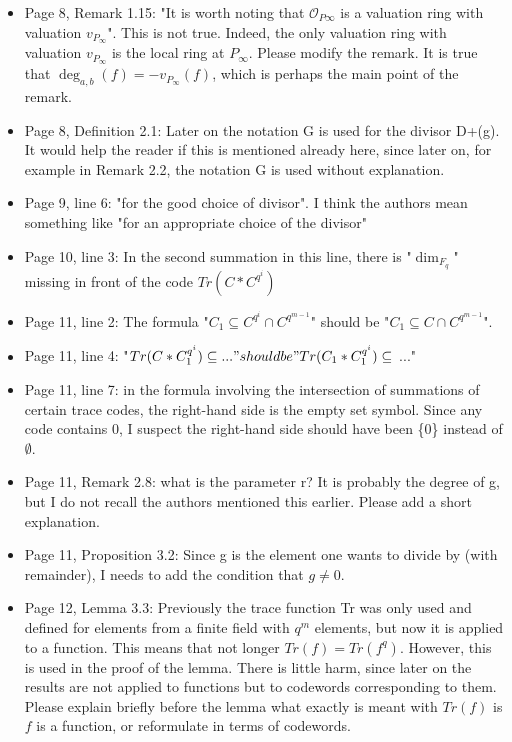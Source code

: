\documentclass[12pt,a4paper]{amsart}
\begin{document}
\begin{itemize}
\item Page 8, Remark 1.15: "It is worth noting that $\mathcal{O}_{P\infty}$ is a valuation ring with valuation $v_{P_\infty}$". This is not true. Indeed, the only valuation ring with valuation $v_{P_\infty}$ is the local ring at $P_\infty$. Please modify the remark. It is true that $\deg_{a,b}(f)=-v_{P_\infty}(f)$, which is perhaps the main point of the remark.

\item Page 8, Definition 2.1: Later on the notation G is used for the divisor D+(g). It would help the reader if this is mentioned already here, since later on, for example in Remark 2.2, the notation G is used without explanation.

\item Page 9, line 6: "for the good choice of divisor". I think the authors mean something like "for an appropriate choice of the divisor"

\item Page 10, line 3: In the second summation in this line, there is "$\dim_{F_{q}}$" missing in front of the code $Tr(C*C^{q^i})$

\item Page 11, line 2: The formula "$C_1 \subseteq C^{q^i} \cap C^{q^{m-1}}$" should be "$C_1 \subseteq C \cap C^{q^{m-1}}$". 

\item Page 11, line 4: "$Tr(C*C_1^{q^i}) \subseteq ..." should be "Tr(C_1*C_1^{q^i}) \subseteq$ ..."

\item Page 11, line 7: in the formula involving the intersection of summations of certain trace codes, the right-hand side is the empty set symbol. Since any code contains 0, I suspect the right-hand side should have been \{0\} instead of $\emptyset$.

\item Page 11, Remark 2.8: what is the parameter r? It is probably the degree of g, but I do not recall the authors mentioned this earlier. Please add a short explanation.

\item Page 11, Proposition 3.2: Since g is the element one wants to divide by (with remainder), I needs to add the condition that $g \neq 0$.

\item Page 12, Lemma 3.3: Previously the trace function Tr was only used and defined for elements from a finite field with $q^m$ elements, but now it is applied to a function. This means that not longer $Tr(f)=Tr(f^q)$. However, this is used in the proof of the lemma. There is little harm, since later on the results are not applied to functions but to codewords corresponding to them. Please explain briefly before the lemma what exactly is meant with $Tr(f)$ is $f$ is a function, or reformulate in terms of codewords.


\end{itemize}
\end{document}
